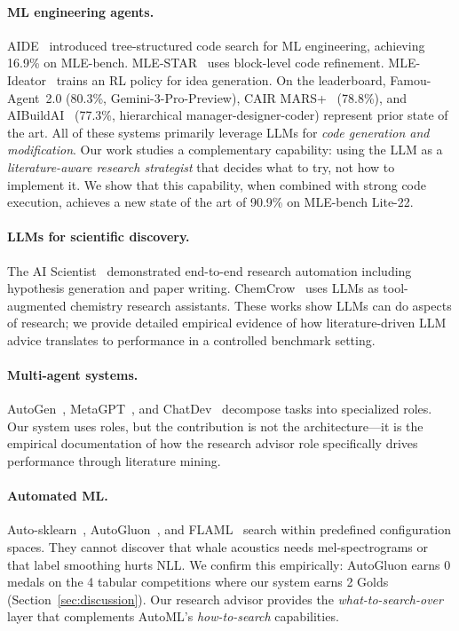 \documentclass{article}
\begin{document}
\paragraph{ML engineering agents.}
AIDE~\citep{aide2024} introduced tree-structured code search for ML engineering, achieving 16.9\% on MLE-bench. MLE-STAR~\citep{zhang2025mlestar} uses block-level code refinement. MLE-Ideator~\citep{yu2025mleideator} trains an RL policy for idea generation. On the leaderboard, Famou-Agent~2.0 (80.3\%, Gemini-3-Pro-Preview), CAIR MARS+~\citep{cairmars2025} (78.8\%), and AIBuildAI~\citep{aibuilai2025} (77.3\%, hierarchical manager-designer-coder) represent prior state of the art. All of these systems primarily leverage LLMs for \emph{code generation and modification}. Our work studies a complementary capability: using the LLM as a \emph{literature-aware research strategist} that decides what to try, not how to implement it. We show that this capability, when combined with strong code execution, achieves a new state of the art of 90.9\% on MLE-bench Lite-22.

\paragraph{LLMs for scientific discovery.}
The AI Scientist~\citep{lu2024aiscientist} demonstrated end-to-end research automation including hypothesis generation and paper writing. ChemCrow~\citep{bran2023chemcrow} uses LLMs as tool-augmented chemistry research assistants. These works show LLMs can do aspects of research; we provide detailed empirical evidence of how literature-driven LLM advice translates to performance in a controlled benchmark setting.

\paragraph{Multi-agent systems.}
AutoGen~\citep{wu2023autogen}, MetaGPT~\citep{hong2023metagpt}, and ChatDev~\citep{qian2023chatdev} decompose tasks into specialized roles. Our system uses roles, but the contribution is not the architecture---it is the empirical documentation of how the research advisor role specifically drives performance through literature mining.

\paragraph{Automated ML.}
Auto-sklearn~\citep{feurer2015autosklearn}, AutoGluon~\citep{erickson2020autogluon}, and FLAML~\citep{wu2021flaml} search within predefined configuration spaces. They cannot discover that whale acoustics needs mel-spectrograms or that label smoothing hurts NLL. We confirm this empirically: AutoGluon earns 0 medals on the 4 tabular competitions where our system earns 2 Golds (Section~\ref{sec:discussion}). Our research advisor provides the \emph{what-to-search-over} layer that complements AutoML's \emph{how-to-search} capabilities.
\end{document}
